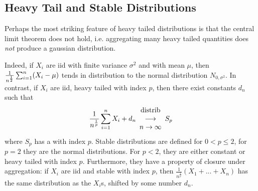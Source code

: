 %
\begin{figure}[htbp]
\end{figure}
%
\subsection{Heavy Tail and Stable Distributions}
Perhaps the most striking feature of heavy tailed
distributions is that the central limit theorem
does not hold, i.e. aggregating many heavy tailed
quantities does \emph{not} produce a gaussian
distribution.

Indeed, if $X_i$ are iid with finite variance
$\sigma^2$ and with mean $\mu$, then
$\frac{1}{n^{1 \over 2}}\sum_{i=1}^n(X_i -\mu)$
tends in distribution to the normal distribution
$N_{0,\sigma^2}$. In contrast, if $X_i$ are iid,
heavy tailed with index $p$, then there exist
constants $d_n$ such that
$$
\frac{1}{n^{1 \over p}}\sum_{i=1}^n X_i + d_n
\begin{array}{c}
 \mathrm{distrib}\\
 {\longrightarrow}\\
 n\rightarrow \infty
\end{array}
S_p
$$
where $S_p$ has a 
\label{def-stable}with index $p$. Stable
distributions are defined for $0<p\leq 2$, for
$p=2$ they are the normal distributions. For
$p<2$, they are either constant or heavy tailed
with index $p$. Furthermore, they have a property
of closure under aggregation: if $X_i$ are iid
and stable with index $p$, then
$\frac{1}{n^{\frac{1}{p}}}(X_1 +...+X_n)$ has the
same distribution as the $X_i$s, shifted by some
number $d_n$.

